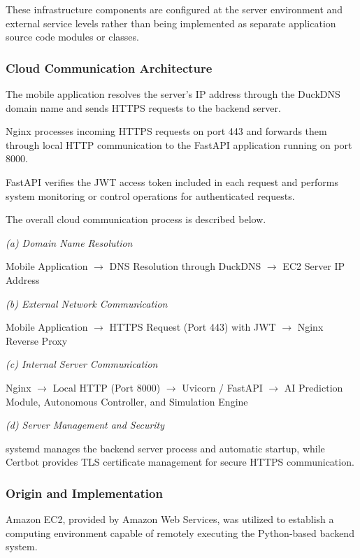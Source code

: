 \documentclass[conference]{IEEEtran}
\begin{document}
These infrastructure components are configured at the server environment and external service levels rather than being implemented as separate application source code modules or classes.

\subsubsection{Cloud Communication Architecture}

The mobile application resolves the server's IP address through the DuckDNS domain name and sends HTTPS requests to the backend server.

Nginx processes incoming HTTPS requests on port 443 and forwards them through local HTTP communication to the FastAPI application running on port 8000.

FastAPI verifies the JWT access token included in each request and performs system monitoring or control operations for authenticated requests.

The overall cloud communication process is described below.

\emph{(a) Domain Name Resolution}

Mobile Application \ensuremath{\rightarrow} DNS Resolution through DuckDNS \ensuremath{\rightarrow} EC2 Server IP Address

\emph{(b) External Network Communication}

Mobile Application \ensuremath{\rightarrow} HTTPS Request (Port 443) with JWT \ensuremath{\rightarrow} Nginx Reverse Proxy

\emph{(c) Internal Server Communication}

Nginx \ensuremath{\rightarrow} Local HTTP (Port 8000) \ensuremath{\rightarrow} Uvicorn / FastAPI \ensuremath{\rightarrow} AI Prediction Module, Autonomous Controller, and Simulation Engine

\emph{(d) Server Management and Security}

systemd manages the backend server process and automatic startup, while Certbot provides TLS certificate management for secure HTTPS communication.

\subsubsection{Origin and Implementation}

Amazon EC2, provided by Amazon Web Services, was utilized to establish a computing environment capable of remotely executing the Python-based backend system.
\end{document}
